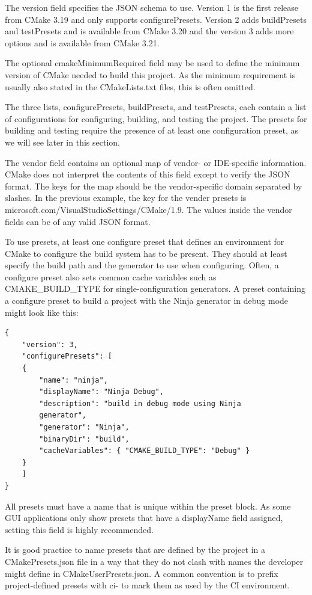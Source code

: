The version field specifies the JSON schema to use. Version 1 is the first release from CMake 3.19 and only supports configurePresets. Version 2 adds buildPresets and testPresets and is available from CMake 3.20 and the version 3 adds more options and is available from CMake 3.21.

The optional cmakeMinimumRequired field may be used to define the minimum version of CMake needed to build this project. As the minimum requirement is usually also stated in the CMakeLists.txt files, this is often omitted.

The three lists, configurePresets, buildPresets, and testPresets, each contain a list of configurations for configuring, building, and testing the project. The presets for building and testing require the presence of at least one configuration preset, as we will see later in this section.

The vendor field contains an optional map of vendor- or IDE-specific information. CMake does not interpret the contents of this field except to verify the JSON format. The keys for the map should be the vendor-specific domain separated by slashes. In the previous example, the key for the vender presets is microsoft.com/VisualStudioSettings/CMake/1.9. The values inside the vendor fields can be of any valid JSON format.

To use presets, at least one configure preset that defines an environment for CMake to configure the build system has to be present. They should at least specify the build path and the generator to use when configuring. Often, a configure preset also sets common cache variables such as CMAKE\_BUILD\_TYPE for single-configuration generators. A preset containing a configure preset to build a project with the Ninja generator in debug mode might look like this:

\begin{lstlisting}[style=styleCMake]
{
	"version": 3,
	"configurePresets": [
	{
		"name": "ninja",
		"displayName": "Ninja Debug",
		"description": "build in debug mode using Ninja
		generator",
		"generator": "Ninja",
		"binaryDir": "build",
		"cacheVariables": { "CMAKE_BUILD_TYPE": "Debug" }
	}
	]
}
\end{lstlisting}

All presets must have a name that is unique within the preset block. As some GUI applications only show presets that have a displayName field assigned, setting this field is highly recommended.

\begin{tcolorbox}[colback=blue!5!white,colframe=blue!75!black,title=Naming Conventions for Presets]
It is good practice to name presets that are defined by the project in a
CMakePresets.json file in a way that they do not clash with names the developer might define in CMakeUserPresets.json. A common convention is to prefix project-defined presets with ci- to mark them as used by the CI environment.
\end{tcolorbox}

